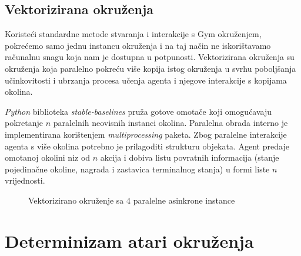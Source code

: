 \subsection{Vektorizirana okruženja}

Koristeći standardne metode stvaranja i interakcije s Gym okruženjem, pokrećemo samo jednu instancu okruženja i na taj način ne iskorištavamo računalnu snagu koja nam je dostupna u potpunosti. Vektorizirana okruženja  su okruženja koja paralelno pokreću više kopija istog okruženja u svrhu poboljšanja učinkovitosti i ubrzanja procesa učenja agenta i njegove interakcije s kopijama okolina.

\textit{Python} biblioteka \textit{stable-baselines} \cite{BaselinesVecEnvs} pruža gotove omotače koji omogućavaju pokretanje $n$ paralelnih neovisnih instanci okolina. Paralelna obrada interno je implementirana korištenjem \textit{multiprocessing} paketa. Zbog paralelne interakcije agenta s više okolina potrebno je prilagoditi strukturu objekata. Agent predaje omotanoj okolini niz od $n$ akcija i dobiva listu povratnih informacija (stanje pojedinačne okoline, nagrada i zastavica terminalnog stanja) u formi liste $n$ vrijednosti.

\begin{figure}[H]
    \centering
    \caption{Vektorizirano okruženje sa 4 paralelne asinkrone instance}
    \label{fig:breakout-vect}
\end{figure}

\section{Determinizam atari okruženja}

